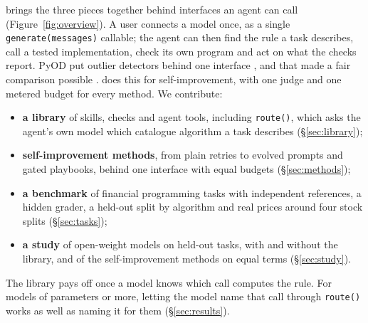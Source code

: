 \lib{} brings the three pieces together behind interfaces an agent can call
(Figure~\ref{fig:overview}). A user connects a model once, as a single
\texttt{generate(messages)} callable; the agent can then find the rule a task describes, call a
tested implementation, check its own program and act on what the checks report. PyOD put
outlier detectors behind one interface \citep{zhao2019pyod,chen2025pyod2}, and that made a fair
comparison possible \citep{han2022adbench}. \lib{} does this for self-improvement, with one judge
and one metered budget for every method. We contribute:
\begin{itemize}
\item \textbf{a library} of skills, checks and agent tools, including \texttt{route()}, which
asks the agent's own model which catalogue algorithm a task describes (\S\ref{sec:library});
\item \textbf{\NMethods{} self-improvement methods}, from plain retries to evolved prompts and
gated playbooks, behind one interface with equal budgets (\S\ref{sec:methods});
\item \textbf{a benchmark} of \NTasks{} financial programming tasks with independent
references, a hidden grader, a held-out split by algorithm and real prices around four stock
splits (\S\ref{sec:tasks});
\item \textbf{a study} of \StudyModels{} open-weight models on held-out tasks, with and without
the library, and of the self-improvement methods on equal terms (\S\ref{sec:study}).
\end{itemize}
The library pays off once a model knows which call computes the rule. For models of
\FixSizeCut{} parameters or more, letting the model name that call through \texttt{route()}
works as well as naming it for them (\S\ref{sec:results}).
